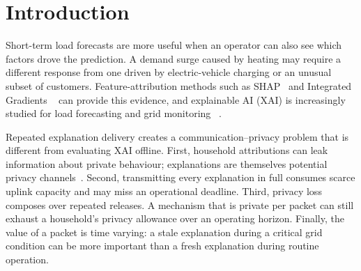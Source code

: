 \documentclass[conference]{IEEEtran}
\begin{document}
\section{Introduction}

Short-term load forecasts are more useful when an operator can also see
which factors drove the prediction. A demand surge caused by heating may
require a different response from one driven by electric-vehicle
charging or an unusual subset of customers. Feature-attribution methods
such as SHAP~\cite{lundberg2017shap} and Integrated Gradients
~\cite{sundararajan2017ig} can provide this evidence, and explainable AI
(XAI) is increasingly studied for load forecasting and grid monitoring
~\cite{bolstad2022load,wu2022load,kruse2021frequency,baur2024loadxai}.

Repeated explanation delivery creates a communication--privacy problem
that is different from evaluating XAI offline. First, household
attributions can leak information about private behaviour; explanations
are themselves potential privacy channels~\cite{shokri2021privacy}.
Second, transmitting every explanation in full consumes scarce uplink
capacity and may miss an operational deadline. Third, privacy loss
composes over repeated releases. A mechanism that is private per packet
can still exhaust a household's privacy allowance over an operating
horizon. Finally, the value of a packet is time varying: a stale
explanation during a critical grid condition can be more important than
a fresh explanation during routine operation.
\end{document}
